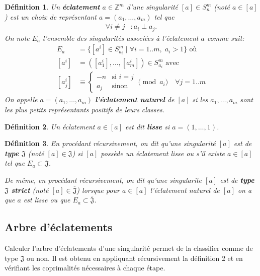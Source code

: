 \documentclass{article}
\newtheorem{definition}{Définition}
\newcommand{\J}{\mathfrak{J}}
\newcommand{\JS}{\overline{\J}}
\begin{document}
\begin{definition}
    Un \textbf{éclatement} $a \in \mathbb{Z}^m$ d'une singularité $[a] \in S_n^m$ (noté $a \in [a]$) est un choix de 
    représentant $a = (a_1, \dots, a_m)$ tel que
    \begin{align*}
        \forall i \neq j & : a_i \perp a_j.
    \end{align*}
    On note $E_a$ l'ensemble des singularités associées à l'éclatement $a$ comme suit:
    \begin{align*}
        E_a & = \{ [a^i] \in S_{a_i}^m \mid \forall i = 1..m,\; a_i > 1 \} \text{ où}\\
        [a^i] & = ([a^i_1], \dots, [a^i_m]) \in S_{a_i}^m \text{ avec} \\
        [a^i_j] & \equiv \begin{cases}
            -n & \text{si $i = j$} \\
            a_j & \text{sinon}
        \end{cases} \pmod{a_i} \quad \forall j = 1..m
    \end{align*}
    On appelle $a = (a_1, \dots, a_m)$ \textbf{l'éclatement naturel} de $[a]$ si 
    les $a_1, \dots, a_m$ sont les plus petits représentants positifs de leurs classes.
\end{definition}

\begin{definition}
    Un éclatement $a \in [a]$ est dit \textbf{lisse} si $a = (1, \dots, 1)$.
\end{definition}

\begin{definition}
    En procédant récursivement, on dit qu'une singularité $[a]$ est de \textbf{type $\J$} (noté $[a] \in \J$)
    si $[a]$ possède un éclatement lisse ou s'il existe $a \in [a]$ tel que $E_a \subset \J$.

    De même, en procédant récursivement, on dit qu'une singularite $[a]$ est de \textbf{type $\J$ strict} (noté $[a] \in \JS$) lorsque 
    pour $a \in [a]$ l'éclatement naturel de $[a]$ on a que $a$ est lisse ou que $E_a \subset \JS$.
\end{definition}

\newpage

\subsection{Arbre d'éclatements}

Calculer l'arbre d'éclatements d'une singularité permet de la classifier 
comme de type $\J$ ou non. Il est obtenu en appliquant récursivement la définition 2
et en vérifiant les coprimalités nécessaires à chaque étape.
\end{document}
